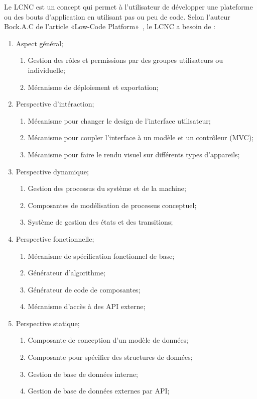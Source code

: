 Le LCNC est un concept qui permet à l’utilisateur de développer une plateforme ou des bouts d'application en utilisant pas ou peu de code. Selon l'auteur Bock.A.C de l'article «Low-Code Platform»~\cite{LC_bock_2021}, le LCNC a besoin de : 
\begin{enumerate}
    \item Aspect général;
    \begin{enumerate}
        \item Gestion des rôles et permissions par des groupes utilisateurs ou individuelle;
        \item Mécanisme de déploiement et exportation;
    \end{enumerate}
    \item Perspective d’intéraction;
    \begin{enumerate}
        \item Mécanisme pour changer le design de l’interface utilisateur;
        \item Mécanisme pour coupler l’interface à un modèle et un contrôleur (MVC);
        \item Mécanisme pour faire le rendu visuel sur différents types d’appareils;
    \end{enumerate}
    \item Perspective dynamique;
    \begin{enumerate}
        \item Gestion des processus du système et de la machine;
        \item Composantes de modélisation de processus conceptuel;
        \item Système de gestion des états et des transitions;
    \end{enumerate}
    \item Perspective fonctionnelle;
    \begin{enumerate}
        \item Mécanisme de spécification fonctionnel de base;
        \item Générateur d’algorithme;
        \item Générateur de code de composantes;
        \item Mécanisme d’accès à des API externe;
    \end{enumerate}
    \item Perspective statique;
    \begin{enumerate}
        \item Composante de conception d’un modèle de données;
        \item Composante pour spécifier des structures de données;
        \item Gestion de base de données interne;
        \item Gestion de base de données externes par API;
    \end{enumerate}
\end{enumerate}

